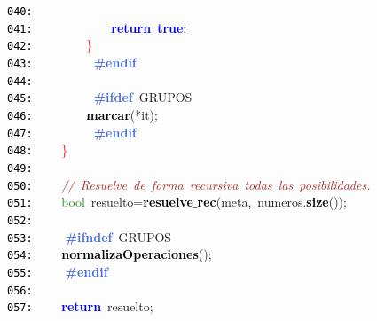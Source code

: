 \documentclass[a4paper,10pt]{scrartcl}
\begin{document}
{   \mbox{}\texttt{\textcolor{Black}{040:}} \ \ \ \ \ \ \ \ \ \ \ \  \\
   \mbox{}\texttt{\textcolor{Black}{041:}} \ \ \ \ \ \ \ \ \ \ \ \ \textbf{\textcolor{Blue}{return}}\ \textbf{\textcolor{Blue}{true}}\textcolor{BrickRed}{;} \\
   \mbox{}\texttt{\textcolor{Black}{042:}} \ \ \ \ \ \ \ \ \textcolor{Red}{\}} \\
   \mbox{}\texttt{\textcolor{Black}{043:}} \textbf{\textcolor{RoyalBlue}{\ \ \ \ \ \ \ \ \#endif}} \\
   \mbox{}\texttt{\textcolor{Black}{044:}} \ \ \ \  \\
   \mbox{}\texttt{\textcolor{Black}{045:}} \textbf{\textcolor{RoyalBlue}{\ \ \ \ \ \ \ \ \#ifdef}}\ GRUPOS \\
   \mbox{}\texttt{\textcolor{Black}{046:}} \ \ \ \ \ \ \ \ \textbf{\textcolor{Black}{marcar}}\textcolor{BrickRed}{(*}it\textcolor{BrickRed}{);} \\
   \mbox{}\texttt{\textcolor{Black}{047:}} \textbf{\textcolor{RoyalBlue}{\ \ \ \ \ \ \ \ \#endif}} \\
   \mbox{}\texttt{\textcolor{Black}{048:}} \ \ \ \ \textcolor{Red}{\}} \\
   \mbox{}\texttt{\textcolor{Black}{049:}} \ \  \\
   \mbox{}\texttt{\textcolor{Black}{050:}} \ \ \ \ \textit{\textcolor{Brown}{//\ Resuelve\ de\ forma\ recursiva\ todas\ las\ posibilidades.}} \\
   \mbox{}\texttt{\textcolor{Black}{051:}} \ \ \ \ \textcolor{ForestGreen}{bool}\ resuelto\textcolor{BrickRed}{=}\textbf{\textcolor{Black}{resuelve$\_$rec}}\textcolor{BrickRed}{(}meta\textcolor{BrickRed}{,}\ numeros\textcolor{BrickRed}{.}\textbf{\textcolor{Black}{size}}\textcolor{BrickRed}{());} \\
   \mbox{}\texttt{\textcolor{Black}{052:}} \ \  \\
   \mbox{}\texttt{\textcolor{Black}{053:}} \textbf{\textcolor{RoyalBlue}{\ \ \ \ \#ifndef}}\ GRUPOS \\
   \mbox{}\texttt{\textcolor{Black}{054:}} \ \ \ \ \textbf{\textcolor{Black}{normalizaOperaciones}}\textcolor{BrickRed}{();} \\
   \mbox{}\texttt{\textcolor{Black}{055:}} \textbf{\textcolor{RoyalBlue}{\ \ \ \ \#endif}} \\
   \mbox{}\texttt{\textcolor{Black}{056:}} \ \  \\
   \mbox{}\texttt{\textcolor{Black}{057:}} \ \ \ \ \textbf{\textcolor{Blue}{return}}\ resuelto\textcolor{BrickRed}{;} \\
}
\end{document}
